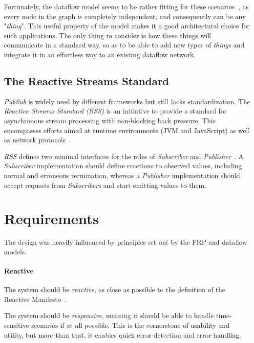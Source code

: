 \documentclass[sigplan,review,anonymous]{acmart}
\begin{document}
Fortunately, the dataflow model seems to be rather fitting for these
scenarios~\cite{iot_dataflow}, as every node in the graph is completely
independent, and consequently can be any "\textit{thing}". This useful property
of the model makes it a good architectural choice for such applications. The
only thing to consider is how these things will communicate in a standard way,
so as to be able to add new types of \textit{things} and integrate it in an
effortless way to an existing dataflow network.

\subsection{The Reactive Streams Standard}

\textit{PubSub} is widely used by different frameworks but still lacks
standardization. The \textit{Reactive Streams Standard (RSS)} is an initiative
to provide a standard for asynchronous stream processing with non-blocking back
pressure. This encompasses efforts aimed at runtime environments (JVM and
JavaScript) as well as network protocols~\cite{rss}.

\textit{RSS} defines two minimal interfaces for the roles of \textit{Subscriber}
and \textit{Publisher}~\cite{rss_docs}.
A \textit{Subscriber} implementation should define
reactions to observed values, including normal and erroneous termination,
whereas a \textit{Publisher} implementation should accept requests from
\textit{Subscribers} and start emitting values to them.

\section{Requirements} \label{sec:requirements}

The design was heavily influenced by principles set out by the FRP and dataflow
models.

\paragraph{Reactive}
The system should be \textit{reactive}, as close as possible to the definition
of the Reactive Manifesto~\cite{manifesto}.

The system should be \textit{responsive}, meaning it should be able to handle
time-sensitive scenarios if at all possible. This is the cornerstone of
usability and utility, but more than that, it enables quick error-detection and
error-handling.
\end{document}
